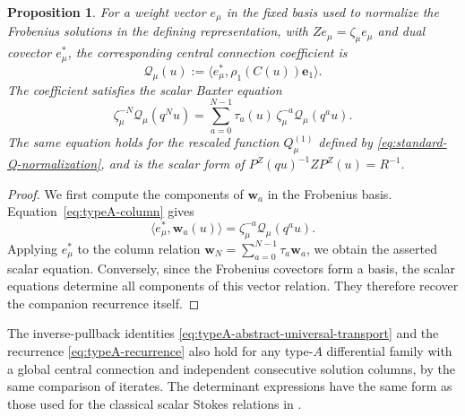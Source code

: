 \documentclass[11pt,leqno]{amsart}
\numberwithin{equation}{section}
\theoremstyle{plain}
\newtheorem{proposition}[theorem]{Proposition}
\theoremstyle{definition}
\theoremstyle{plain}
\theoremstyle{definition}
\theoremstyle{remark}
\begin{document}
\begin{proposition}\label{prop:typeA-TQ}
For a weight vector $e_\mu$ in the fixed basis used to normalize the Frobenius solutions in the defining representation, with
$Z e_\mu=\zeta_\mu e_\mu$ and dual covector $e_\mu^*$, the corresponding central connection coefficient is
\begin{equation}\label{eq:typeA-Qmu}
 \mathcal Q_\mu(u):=\bigl\langle e_\mu^*,\rho_1(C(u))\mathbf e_1\bigr\rangle.
\end{equation}
The coefficient satisfies the scalar Baxter equation
\begin{equation}\label{eq:typeA-TQ-general}
 \zeta_\mu^{-N}\mathcal Q_\mu(q^Nu)
 =\sum_{a=0}^{N-1}\tau_a(u)\,\zeta_\mu^{-a}\mathcal Q_\mu(q^au).
\end{equation}
The same equation holds for
the rescaled function $Q_\mu^{(1)}$ defined by \eqref{eq:standard-Q-normalization}, and is the scalar form of
$P^Z(qu)^{-1}ZP^Z(u)=R^{-1}$.
\end{proposition}

\begin{proof}
We first compute the components of $\mathbf w_a$ in the Frobenius basis.  Equation~\eqref{eq:typeA-column} gives
\begin{equation}\label{eq:typeA-row-column}
 \bigl\langle e_\mu^*,\mathbf w_a(u)\bigr\rangle
 =\zeta_\mu^{-a}\mathcal Q_\mu(q^au).
\end{equation}
Applying $e_\mu^*$ to the column relation
$\mathbf w_N=\sum_{a=0}^{N-1}\tau_a\mathbf w_a$, we obtain the asserted scalar equation.  Conversely, since the Frobenius covectors form a basis, the scalar equations determine all components of this vector relation.  They therefore recover the companion recurrence itself.
\end{proof}

The inverse-pullback identities \eqref{eq:typeA-abstract-universal-transport} and the recurrence \eqref{eq:typeA-recurrence} also hold for any type-$A$ differential family with a global central connection and independent consecutive solution columns, by the same comparison of iterates. The determinant expressions have the same form as those used for the classical scalar Stokes relations in \cite[Sections~3--4]{DDT2000}.
\end{document}
